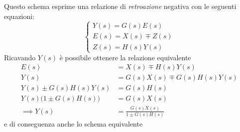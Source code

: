 Questo schema esprime una relazione di \emph{retroazione} negativa con le seguenti equazioni:
\[\begin{cases}
	Y(s) = G(s)E(s) \\
	E(s) = X(s) \mp Z(s) \\
	Z(s) = H(s)Y(s)
\end{cases}\]
Ricavando \(Y(s)\) è possibile ottenere la relazione equivalente
\begin{align*}
	E(s) &= X(s) \mp H(s)Y(s) \\
	Y(s) &= G(s)X(s) \mp G(s)H(s)Y(s) \\
	Y(s) \pm G(s)H(s)Y(s) &= G(s)H(s) \\
	Y(s) \bigl(1 \pm G(s)H(s)\bigr) &= G(s)X(s) \\
	\implies Y(s) &= \frac{G(s)X(s)}{1 \pm G(s)H(s)}
\end{align*}
e di conseguenza anche lo schema equivalente
\begin{center}\end{center}
